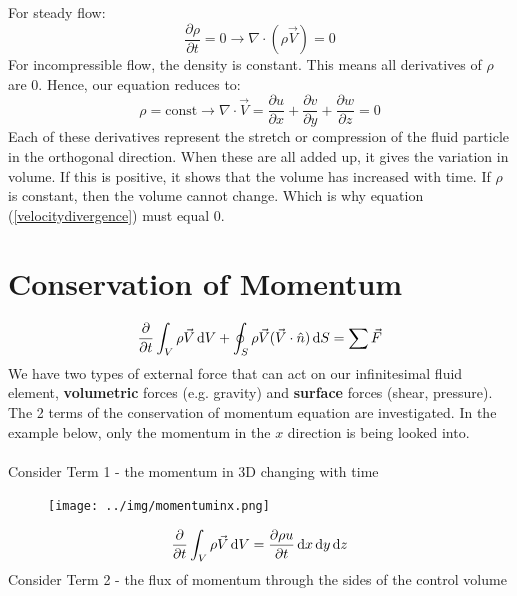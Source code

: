 \documentclass[class=report, crop=false, 12pt,a4paper]{standalone}
\begin{document}
For steady flow:
\begin{equation}
  \frac{\partial \rho}{\partial t} = 0 \rightarrow \nabla \cdot (\rho \vec{V}) = 0
\end{equation}
For incompressible flow, the density is constant. This means all derivatives of $\rho$ are 0. Hence, our equation reduces to:
\begin{equation}
  \rho = \textrm{const} \rightarrow \nabla \cdot \vec{V} = \frac{\partial u}{\partial x} + \frac{\partial v}{\partial y} + \frac{\partial w}{\partial z} = 0 
  \label{velocitydivergence}
\end{equation}
Each of these derivatives represent the stretch or compression of the fluid particle in the orthogonal direction. When these are all added up, it gives the variation in volume. If this is positive, it shows that the volume has increased with time. If $\rho$ is constant, then the volume cannot change. Which is why equation (\ref{velocitydivergence}) must equal 0.
\section{Conservation of Momentum}
\begin{equation}
  \frac{\partial}{\partial t} \int_V \rho \vec{V} \dif V + \oint_S \rho \vec{V}(\vec{V} \cdot \hat{n}) \dif S = \sum \vec{F}
  \label{conservationofmomentum}
\end{equation}
We have two types of external force that can act on our infinitesimal fluid element, \textbf{volumetric} forces (e.g. gravity) and \textbf{surface} forces (shear, pressure). The 2 terms of the conservation of momentum equation are investigated. In the example below, only the momentum in the $x$ direction is being looked into. \\\\ 
Consider Term 1 - the momentum in 3D changing with time
\begin{figure}[H]
  \centering
  \texttt{[image: ../img/momentuminx.png]}
\end{figure}
\begin{gather}
  \frac{\partial}{\partial t} \int_V \rho \vec{V} \dif V = \frac{\partial \rho u}{\partial t}\dif x \dif y \dif z
  \label{momentumin3d}
\end{gather}
Consider Term 2 - the flux of momentum through the sides of the control volume \\
\end{document}
